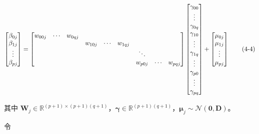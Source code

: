 \documentclass[12pt,a4paper]{ctexart}
\makeatletter
\numberwithin{figure}{section}
\numberwithin{table}{section}
\let\ltx@orig@tag\tag
\renewcommand{\tag}[1]{\refstepcounter{equation}\ltx@orig@tag{#1}}%
\makeatother
\begin{document}
\begin{equation}
\begin{bmatrix} \beta_{0j} \\ \beta_{1j} \\ \vdots \\ \beta_{pj} \end{bmatrix}
=
\begin{bmatrix}
w_{00j} & \cdots & w_{0qj} & & & & & & \\
& & & w_{10j} & \cdots & w_{1qj} & & & \\
& & & & & & \ddots & & \\
& & & & & & w_{p0j} & \cdots & w_{pqj}
\end{bmatrix}
\begin{bmatrix} \gamma_{00} \\ \vdots \\ \gamma_{0q} \\ \gamma_{10} \\ \vdots \\ \gamma_{1q} \\ \vdots \\ \gamma_{p0} \\ \vdots \\ \gamma_{pq} \end{bmatrix}
+
\begin{bmatrix} \mu_{0j} \\ \mu_{1j} \\ \vdots \\ \mu_{pj} \end{bmatrix}
\tag{4-4}
\end{equation}

其中 $\mathbf{W}_j \in \mathbb{R}^{(p+1) \times (p+1)(q+1)}$，$\boldsymbol{\gamma} \in \mathbb{R}^{(p+1)(q+1)}$，$\boldsymbol{\mu}_j \sim \mathcal{N}(\mathbf{0}, \mathbf{D})$。

令
\end{document}
